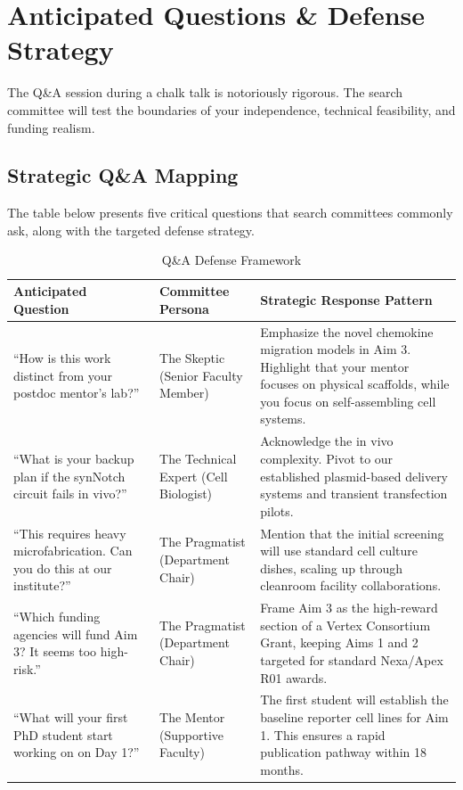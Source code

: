 \section{Anticipated Questions \& Defense Strategy}
The Q\&A session during a chalk talk is notoriously rigorous. The search committee will test the boundaries of your independence, technical feasibility, and funding realism.

\subsection{Strategic Q\&A Mapping}
The table below presents five critical questions that search committees commonly ask, along with the targeted defense strategy.

\begin{table}[h]
\centering
\caption{Q\&A Defense Framework}
\label{tab:qa_strategy}
\begin{tabular}{@{}p{4.5cm}p{3.5cm}p{9.0cm}@{}}
\toprule
\textbf{Anticipated Question} & \textbf{Committee Persona} & \textbf{Strategic Response Pattern} \\ \midrule
``How is this work distinct from your postdoc mentor's lab?'' & The Skeptic (Senior Faculty Member) & Emphasize the novel chemokine migration models in Aim 3. Highlight that your mentor focuses on physical scaffolds, while you focus on self-assembling cell systems. \\ \addlinespace
``What is your backup plan if the synNotch circuit fails in vivo?'' & The Technical Expert (Cell Biologist) & Acknowledge the in vivo complexity. Pivot to our established plasmid-based delivery systems and transient transfection pilots. \\ \addlinespace
``This requires heavy microfabrication. Can you do this at our institute?'' & The Pragmatist (Department Chair) & Mention that the initial screening will use standard cell culture dishes, scaling up through cleanroom facility collaborations. \\ \addlinespace
``Which funding agencies will fund Aim 3? It seems too high-risk.'' & The Pragmatist (Department Chair) & Frame Aim 3 as the high-reward section of a Vertex Consortium Grant, keeping Aims 1 and 2 targeted for standard Nexa/Apex R01 awards. \\ \addlinespace
``What will your first PhD student start working on on Day 1?'' & The Mentor (Supportive Faculty) & The first student will establish the baseline reporter cell lines for Aim 1. This ensures a rapid publication pathway within 18 months. \\ \bottomrule
\end{tabular}
\end{table}

